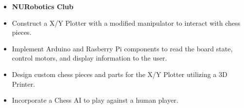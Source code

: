 \documentclass[10pt,a4paper,ragged2e,withhyper]{altacv}
\begin{document}
\begin{paracol}{2}
    \begin{itemize}
        \item[] \textbf{NURobotics Club}
        \item Construct a X/Y Plotter with a modified manipulator to interact with chess pieces.
        \item Implement Arduino and Rasberry Pi components to read the board state, control motors, and display information to the user.
        \item Design custom chess pieces and parts for the X/Y Plotter utilizing a 3D Printer.
        \item Incorporate a Chess AI to play against a human player.
    \end{itemize}





\end{paracol}
\end{document}
